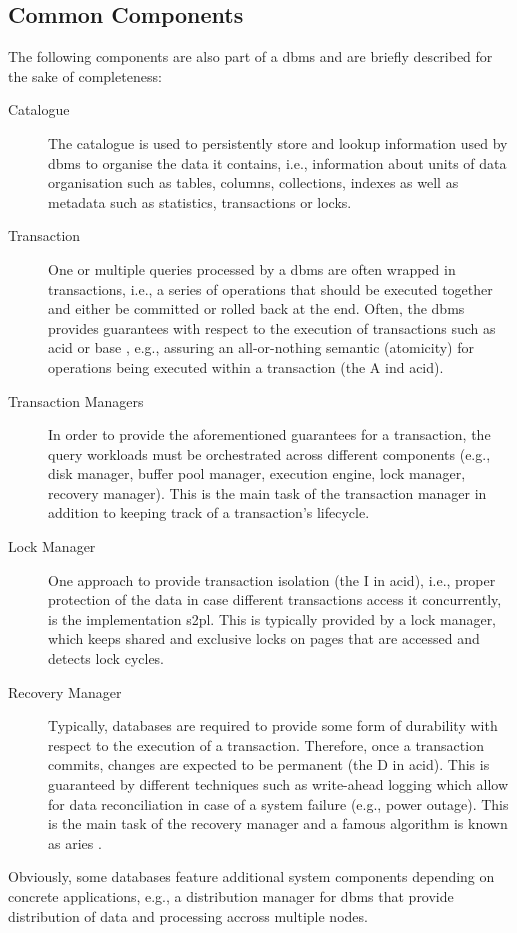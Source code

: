 \subsection{Common Components}

The following components are also part of a \acrshort{dbms} and are briefly described for the sake of completeness:

\begin{description}
    \item[Catalogue] The catalogue is used to persistently store and lookup information used by \acrshort{dbms} to organise the data it contains, i.e., information about units of data organisation such as tables, columns, collections, indexes as well as metadata such as statistics, transactions or locks.
    \item[Transaction] One or multiple queries processed by a \acrshort{dbms} are often wrapped in transactions, i.e., a series of operations that should be executed together and either be committed or rolled back at the end. Often, the \acrshort{dbms} provides guarantees with respect to the execution of transactions such as \acrshort{acid} \cite{Haerder:1983principles} or \acrshort{base} \cite{Pritchett:2008Base}, e.g., assuring an all-or-nothing semantic (atomicity) for operations being executed within a transaction (the A ind \acrshort{acid}).
    \item[Transaction Managers] In order to provide the aforementioned guarantees for a transaction, the query workloads must be orchestrated across different components (e.g., disk manager, buffer pool manager, execution engine, lock manager, recovery manager). This is the main task of the transaction manager in addition to keeping track of a transaction's lifecycle.
    \item[Lock Manager] One approach to provide transaction isolation (the I in \acrshort{acid}), i.e., proper protection of the data in case different transactions access it concurrently, is the implementation \acrfull{s2pl}. This is typically provided by a lock manager, which keeps shared and exclusive locks on pages that are accessed and detects lock cycles.
    \item[Recovery Manager] Typically, databases are required to provide some form of durability with respect to the execution of a transaction. Therefore, once a transaction commits, changes are expected to be permanent (the D in \acrshort{acid}). This is guaranteed by different techniques such as write-ahead logging which allow for data reconciliation in case of a system failure (e.g., power outage). This is the main task of the recovery manager and a famous algorithm is known as \acrshort{aries} \cite{Mohan:1992Aries}.
\end{description}

Obviously, some databases feature additional system components depending on concrete applications, e.g., a distribution manager for \acrshort{dbms} that provide distribution of data and processing accross multiple nodes.